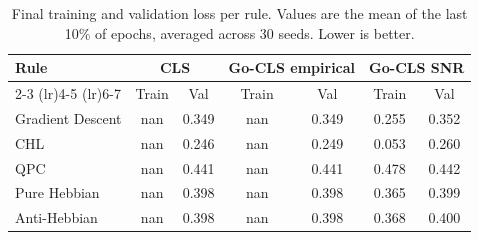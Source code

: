 \begin{table}[H]
\centering
\caption{Final training and validation loss per rule. Values are the mean of the last 10\% of epochs, averaged across 30 seeds. Lower is better.}
\label{tab:go_cls_snr_summary}
\begin{tabular}{lcccccc}
\toprule
\textbf{Rule} & \multicolumn{2}{c}{\textbf{CLS}} & \multicolumn{2}{c}{\textbf{Go-CLS empirical}} & \multicolumn{2}{c}{\textbf{Go-CLS SNR}} \\
\cmidrule(lr){2-3} \cmidrule(lr){4-5} \cmidrule(lr){6-7}
& Train & Val & Train & Val & Train & Val \\
\midrule
Gradient Descent & nan & 0.349 & nan & 0.349 & 0.255 & 0.352 \\
CHL & nan & 0.246 & nan & 0.249 & 0.053 & 0.260 \\
QPC & nan & 0.441 & nan & 0.441 & 0.478 & 0.442 \\
Pure Hebbian & nan & 0.398 & nan & 0.398 & 0.365 & 0.399 \\
Anti-Hebbian & nan & 0.398 & nan & 0.398 & 0.368 & 0.400 \\
\bottomrule
\end{tabular}
\end{table}